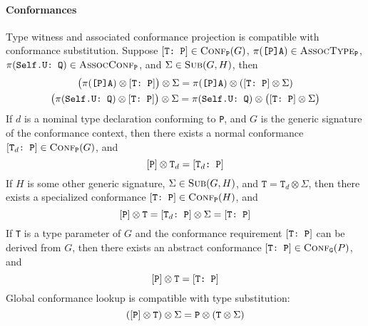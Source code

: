 \documentclass[../generics]{subfiles}
\begin{document}
\paragraph{Conformances} Type witness and associated conformance projection is compatible with conformance substitution. Suppose $[\texttt{T:~P}]\in\textsc{Conf}_{\texttt{P}}({G})$, $\pi(\texttt{[P]A})\in\textsc{AssocType}_{\texttt{P}}$, $\pi(\texttt{Self.U:~Q})\in\textsc{AssocConf}_{\texttt{P}}$, and $\Sigma\in\textsc{Sub}({G, H})$, then
\begin{gather*}
\bigl(\pi(\texttt{[P]A})\otimes [\texttt{T:~P}]\bigr)\otimes \Sigma=\pi(\texttt{[P]A})\otimes ([\texttt{T:~P}]\otimes \Sigma)\\
\bigl(\pi(\texttt{Self.U:~Q})\otimes [\texttt{T:~P}]\bigr)\otimes \Sigma=\pi(\texttt{Self.U:~Q})\otimes \bigl([\texttt{T:~P}]\otimes \Sigma\bigr)
\end{gather*}
If $d$ is a nominal type declaration conforming to \texttt{P}, and $G$ is the generic signature of the conformance context, then there exists a normal conformance $[\texttt{T}_d\texttt{:~P}]\in\textsc{Conf}_{\texttt{P}}({G})$, and
\[[\texttt{P}]\otimes\texttt{T}_d=[\texttt{T}_d\texttt{:~P}]\]
If $H$ is some other generic signature, $\Sigma\in\textsc{Sub}({G, H})$, and $\texttt{T}=\texttt{T}_d\otimes \Sigma$, then there exists a specialized conformance $[\texttt{T}\texttt{:~P}]\in\textsc{Conf}_{\texttt{P}}({H})$, and
\[[\texttt{P}]\otimes\texttt{T}=[\texttt{T}_d\texttt{:~P}]\otimes \Sigma = [\texttt{T}\texttt{:~P}]\]
If \texttt{T} is a type parameter of $G$ and the conformance requirement $[\texttt{T:~P}]$ can be derived from $G$, then there exists an abstract conformance $[\texttt{T}\texttt{:~P}]\in\textsc{Conf}_{\texttt{G}}({P})$, and
\[[\texttt{P}]\otimes\texttt{T} = [\texttt{T}\texttt{:~P}]\]
Global conformance lookup is compatible with type substitution:
\[([\texttt{P}]\otimes\texttt{T})\otimes \Sigma = \texttt{P}\otimes(\texttt{T}\otimes \Sigma)\]
\end{document}
